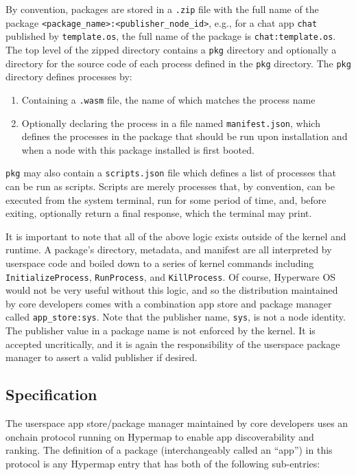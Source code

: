 \documentclass[runningheads]{llncs}
\begin{document}
By convention, packages are stored in a \verb|.zip| file with the full name of the package \verb|<package_name>:<publisher_node_id>|, e.g., for a chat app \verb|chat| published by \verb|template.os|, the full name of the package is \verb|chat:template.os|.
The top level of the zipped directory contains a \verb|pkg| directory and optionally a directory for the source code of each process defined in the \verb|pkg| directory.
The \verb|pkg| directory defines processes by:
\begin{enumerate}
    \item Containing a \verb|.wasm| file, the name of which matches the process name
    \item Optionally declaring the process in a file named \verb|manifest.json|, which defines the processes in the package that should be run upon installation and when a node with this package installed is first booted.
\end{enumerate}

\verb|pkg| may also contain a \verb|scripts.json| file which defines a list of processes that can be run as scripts.
Scripts are merely processes that, by convention, can be executed from the system terminal, run for some period of time, and, before exiting, optionally return a final response, which the terminal may print.

It is important to note that all of the above logic exists outside of the kernel and runtime.
A package's directory, metadata, and manifest are all interpreted by userspace code and boiled down to a series of kernel commands including \verb|InitializeProcess|, \verb|RunProcess|, and \verb|KillProcess|.
Of course, Hyperware OS would not be very useful without this logic, and so the distribution maintained by core developers comes with a combination app store and package manager called \verb|app_store:sys|.
Note that the publisher name, \verb|sys|, is not a node identity.
The publisher value in a package name is not enforced by the kernel.
It is accepted uncritically, and it is again the responsibility of the userspace package manager to assert a valid publisher if desired.

\subsection{Specification}
\label{sec:packagemanagerspec}

The userspace app store/package manager maintained by core developers uses an onchain protocol running on Hypermap to enable app discoverability and ranking.
The definition of a package (interchangeably called an ``app'') in this protocol is any Hypermap entry that has both of the following sub-entries:
\end{document}
